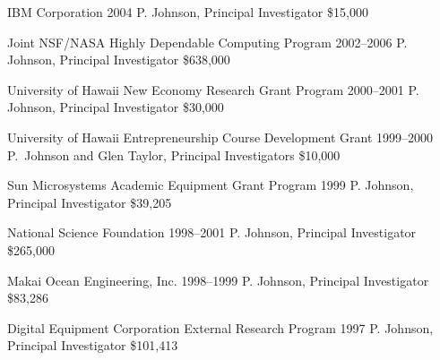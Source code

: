 \documentclass[11pt,letterpaper,sans]{moderncv} %
\begin{document}
        {IBM Corporation} %
        {2004} %
        {P. Johnson, Principal Investigator}  %
        {\$15,000} %

        {Joint NSF/NASA Highly Dependable Computing Program} %
        {2002--2006} %
        {P. Johnson, Principal Investigator}  %
        {\$638,000} %

        {University of Hawaii New Economy Research Grant Program} %
        {2000--2001} %
        {P. Johnson, Principal Investigator}  %
        {\$30,000} %

        {University of Hawaii Entrepreneurship Course Development Grant} %
        {1999--2000} %
        {P.~Johnson and Glen Taylor, Principal Investigators}  %
        {\$10,000} %

        {Sun Microsystems Academic Equipment Grant Program} %
        {1999} %
        {P. Johnson, Principal Investigator}  %
        {\$39,205} %

        {National Science Foundation} %
        {1998--2001} %
        {P. Johnson, Principal Investigator}  %
        {\$265,000} %

        {Makai Ocean Engineering, Inc.} %
        {1998--1999} %
        {P. Johnson, Principal Investigator}  %
        {\$83,286} %

        {Digital Equipment Corporation External Research Program} %
        {1997} %
        {P. Johnson, Principal Investigator}  %
        {\$101,413} %
\end{document}
